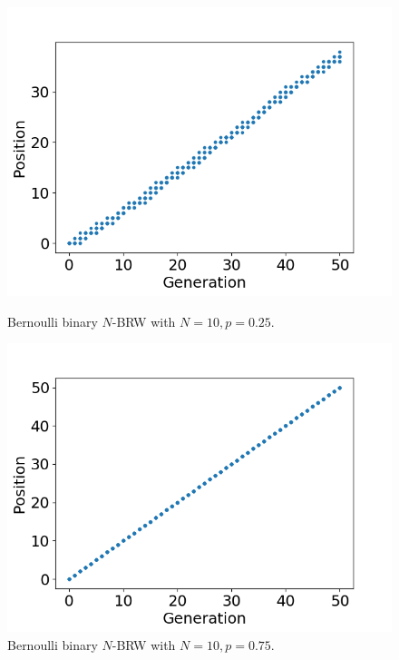 \begin{figure}[!h]
\centering
\begin{minipage}{0.45\textwidth}
  \centering
  \includegraphics[width=.99\linewidth]{graphics/bernoulli_25}
  \caption{Bernoulli binary $N$-BRW with $N=10, p=0.25$. }
  \label{fig:ber25}
\end{minipage}\hfill
\begin{minipage}{0.45\textwidth}
  \centering
  \includegraphics[width=.99\linewidth]{graphics/bernoulli_75}
  \caption{Bernoulli binary $N$-BRW with $N=10, p=0.75$. }
  \label{fig:ber75}
\end{minipage}\hfill%
\end{figure}




